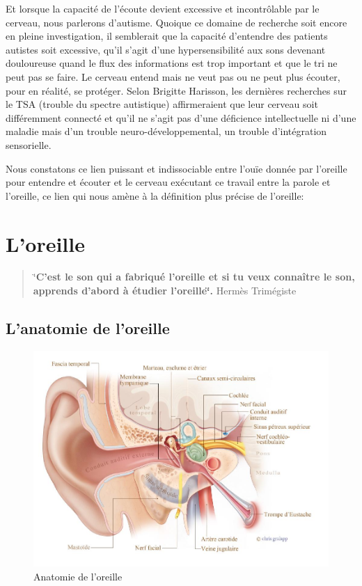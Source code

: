 Et lorsque la capacité de l'écoute devient excessive et incontrôlable par le cerveau, nous 
parlerons d'autisme. Quoique
  ce domaine de recherche  soit encore en pleine investigation, il semblerait que la capacité 
  d'entendre des patients autistes soit excessive, qu'il s'agit d'une hypersensibilité aux sons 
  devenant douloureuse quand  le flux des informations est trop important et que le tri ne 
  peut pas se faire. Le cerveau entend mais ne veut pas ou ne peut plus  écouter, pour en 
  réalité, se protéger.
Selon Brigitte Harisson,  
 les dernières recherches sur le TSA (trouble du spectre autistique) affirmeraient que leur
  cerveau soit différemment connecté et qu'il ne s'agit pas d'une déficience intellectuelle ni
   d'une maladie mais d'un trouble neuro-développemental, un trouble
  d'intégration sensorielle.\autocite[Cet ouvrage propose une description unique du TSA
   (trouble du spectre de l'autisme pp. 22--23)]{harrisson.st-charles:lautisme}

Nous constatons ce lien puissant et indissociable  entre l'ouïe donnée
par l'oreille pour entendre et écouter et le cerveau exécutant ce
travail entre la 
parole et l'oreille, ce lien qui nous amène à la définition plus précise de
l'oreille: 





\section{L'oreille}


\begin{quotation}
	\char`\"{}\textbf{C'est le son qui a fabriqué l'oreille et si tu veux connaître
		le son, apprends d'abord à étudier l\textquoteright oreille\char`\"{}.}
	Hermès Trimégiste 
\end{quotation}

\subsection{L'anatomie de l'oreille}
\begin{figure}
	\centering
	\includegraphics[width=1\linewidth]{images/20160624Berufsfeldgruppen.jpg}
	\caption[Anatomie oreille]{Anatomie de l'oreille}
	\label{fig:-20160624berufsfeldgruppen}
\end{figure}

